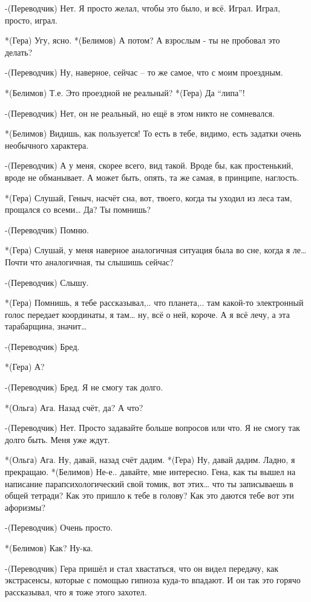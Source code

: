 -(Переводчик) Нет. Я просто желал, чтобы это было, и всё. Играл. Играл, просто, играл.

*(Гера) Угу, ясно.
*(Белимов) А потом? А взрослым - ты не пробовал это делать?

-(Переводчик) Ну, наверное, сейчас – то же самое, что с моим проездным.

*(Белимов) Т.е. Это проездной не реальный?
*(Гера) Да “липа”!

-(Переводчик) Нет, он не реальный, но ещё в этом никто не сомневался.

*(Белимов) Видишь, как пользуется! То есть в тебе, видимо, есть задатки очень необычного  характера.

-(Переводчик) А у меня, скорее всего, вид такой. Вроде бы, как простенький, вроде не обманывает. А может быть, опять,  та же самая, в принципе, наглость.

*(Гера) Слушай, Геныч, насчёт сна, вот, твоего, когда ты уходил из леса там, прощался со всеми… Да? Ты помнишь?

-(Переводчик) Помню.

*(Гера) Слушай, у меня наверное аналогичная ситуация была во сне, когда я ле… Почти что  аналогичная, ты слышишь сейчас?

-(Переводчик) Слышу.

*(Гера) Помнишь, я тебе рассказывал,.. что планета,.. там какой-то электронный голос передает координаты, я там… ну, всё о ней, короче. А я всё лечу, а эта тарабарщина, значит…

-(Переводчик) Бред.

*(Гера) А?

-(Переводчик) Бред. Я не смогу так долго.

*(Ольга) Ага. Назад счёт, да? А что?

-(Переводчик) Нет. Просто задавайте больше вопросов или что. Я не смогу так долго быть. Меня уже ждут.

*(Ольга) Ага. Ну, давай, назад счёт дадим.
*(Гера) Ну, давай дадим. Ладно, я прекращаю.
*(Белимов) Не-е..  давайте, мне интересно. Гена, как ты вышел на написание парапсихологический свой томик, вот этих… что ты записываешь в общей тетради? Как это пришло к тебе в голову? Как это даются тебе вот эти афоризмы?

-(Переводчик) Очень просто.

*(Белимов) Как? Ну-ка.

-(Переводчик) Гера пришёл и стал хвастаться, что он видел передачу, как экстрасенсы, которые с помощью гипноза куда-то впадают. И он так это горячо рассказывал, что я тоже этого захотел.

